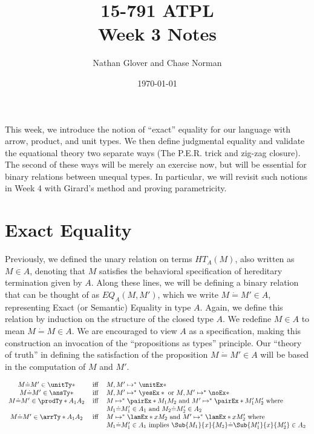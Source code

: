 \documentclass[letterpaper]{article}
\title{15-791 ATPL \\ Week 3 Notes}
\author{Nathan Glover and Chase Norman}
\date{\today}
\begin{document}
\maketitle

This week, we introduce the notion of ``exact'' equality for our language with arrow, product, and unit types.
We then define judgmental equality and validate the equational theory two separate ways (The P.E.R. trick and zig-zag closure).
The second of these ways will be merely an exercise now, but will be essential for binary relations between unequal types.
In particular, we will revisit such notions in Week 4 with Girard's method and proving parametricity.

\section{Exact Equality}

Previously, we defined the unary relation on terms $HT_A(M)$, also written as $M \in A$, denoting that $M$ satisfies the behavioral specification of hereditary termination given by $A$.
Along these lines, we will be defining a binary relation that can be thought of as $EQ_A(M, M')$, which we write $M \dot{=} M' \in A$, representing Exact (or Semantic) Equality in type $A$.
Again, we define this relation by induction on the structure of the closed type $A$. We redefine $M \in A$ to mean $M \dot{=} M \in A$.
We are encouraged to view $A$ as a specification, making this construction an invocation of the ``propositions as types'' principle.
Our ``theory of truth'' in defining the satisfaction of the proposition $M \dot{=} M' \in A$ will be based in the computation of $M$ and $M'$.

\begin{definition}
    $$
  \begin{array}{cll}
      M \dot{=} M' \in \unitTy* & \Iff & M, M' \mapsto^* \unitEx* \\
      M \dot{=} M' \in \ansTy* & \Iff & M, M' \mapsto^* \yesEx* \text{ or } M, M' \mapsto^* \noEx* \\
      M \dot{=} M' \in \prodTy*{A_1}{A_2} & \Iff &
         M \mapsto^* \pairEx*{M_1}{M_2} \text{ and } M' \mapsto^* \pairEx*{M_1'}{M_2'} \text{ where } \\ & & M_1 \dot{=} M_1' \in A_1 \text{ and } M_2 \dot{=} M_2' \in A_2 \\
      M \dot{=} M' \in \arrTy*{A_1}{A_2} & \Iff & M \mapsto^* \lamEx*{x}{M_2} \text{ and } M' \mapsto^* \lamEx*{x}{M_2'} \text{ where }\\ & &
      M_1 \dot{=} M_1' \in A_1 \text{ implies } \Sub{M_1}{x}{M_2} \dot{=} \Sub{M_1'}{x}{M_2'} \in A_2 \\
  \end{array}
  $$
\end{definition}
\end{document}
